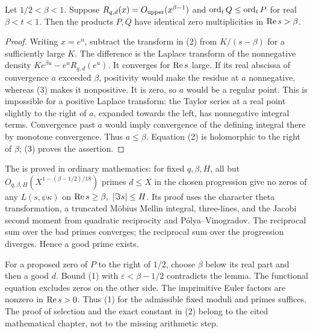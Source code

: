 \begin{lemma}
Let \(1/2<\beta<1\). Suppose \(R_{q,d}(x)=O_{\rm upper}
(x^{\beta-1})\) and \(\operatorname{ord}_t Q\le\operatorname{ord}_t P\) for real
\(\beta<t<1\). Then the products \(P,Q\) have identical zero
multiplicities in \(\operatorname{Re} s>\beta\).
\end{lemma}
\begin{proof}
Writing \(x=e^u\), subtract the transform in (2) from
\(K/(s-\beta)\) for a sufficiently large \(K\). The difference is
the Laplace transform of the nonnegative density
\(Ke^{\beta u}-e^uR_{q,d}(e^u)\). It converges for \(\operatorname{Re} s\)
large. If its real abscissa of convergence \(a\) exceeded \(\beta\),
positivity would make the residue at \(a\) nonnegative, whereas
(3) makes it nonpositive. It is zero, so \(a\) would be a regular
point. This is impossible for a positive Laplace transform:
the Taylor series at a real point slightly to the right of \(a\),
expanded towards the left, has nonnegative integral terms.
Convergence past \(a\) would imply convergence of the defining
integral there by monotone convergence. Thus \(a\le\beta\).
Equation (2) is holomorphic to the right of \(\beta\);
(3) proves the assertion.
\end{proof}

The  is proved in ordinary mathematics:
for fixed \(q,\beta,H\), all but
\(O_{q,\beta,H}(X^{1-(\beta-1/2)/18})\) primes \(d\le X\)
in the chosen progression give no zeros of any \(L(s,\psi\kappa)\)
on \(\operatorname{Re} s\ge\beta,\ |\Im s|\le H\).
Its proof uses the character theta transformation, a truncated
M\"obius Mellin integral, three-lines, and the Jacobi second
moment from quadratic reciprocity and P\'olya--Vinogradov. The
reciprocal sum over the bad primes converges; the reciprocal sum
over the progression diverges. Hence a good prime exists.

For a proposed zero of \(P\) to the right of \(1/2\), choose
\(\beta\) below its real part and then a good \(d\). Bound (1)
with \(\varepsilon<\beta-1/2\) contradicts the lemma.
The functional equation excludes zeros on the other side.
The imprimitive Euler factors are nonzero in \(\operatorname{Re} s>0\).
Thus (1) for the admissible fixed moduli and primes suffices.
The proof of selection and the exact constant in (2) belong to
the cited mathematical chapter, not to the missing arithmetic step.

